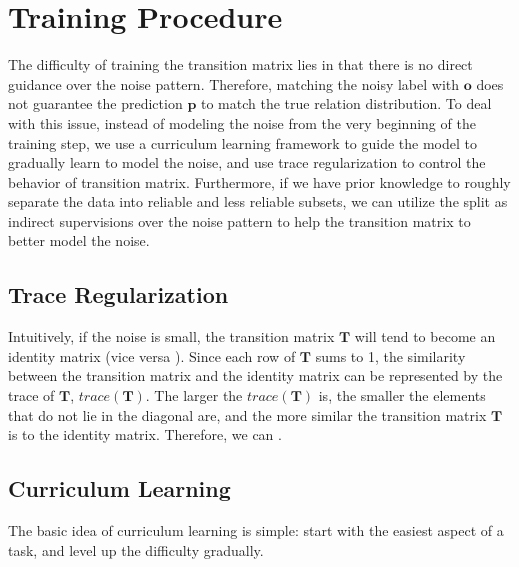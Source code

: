 \section{Training Procedure \label{sec:training}}
The difficulty of training the transition matrix lies in that there is no direct guidance over the noise pattern. Therefore, matching the noisy label with $\mathbf{o}$ does not guarantee the prediction $\mathbf{p}$ to match the true relation distribution. To deal with this issue, instead of modeling the noise from the very beginning of the training step, we use a curriculum learning framework to guide the model to gradually learn to model the noise, and use trace regularization to control the behavior of transition matrix. Furthermore, if we have prior knowledge to roughly separate the data into reliable and less reliable subsets, we can utilize the split as indirect supervisions over the noise pattern to help the transition matrix to better model the noise.

\subsection{Trace Regularization}
Intuitively, if the noise is small, the transition matrix $\mathbf{T}$ will tend to become an identity matrix (vice versa ).  Since each row of $\mathbf{T}$ sums to 1, the similarity between the transition matrix and the identity matrix can be represented by the trace of $\mathbf{T}$, $trace(\mathbf{T})$. The larger the $trace(\mathbf{T})$ is, the smaller the elements that do not lie in the diagonal are, and the more similar the transition matrix $\mathbf{T}$ is to the identity matrix. Therefore, we can . 

\subsection{Curriculum Learning}
The basic idea of curriculum learning is simple: start with the easiest aspect of a task, and level up the difficulty gradually.

